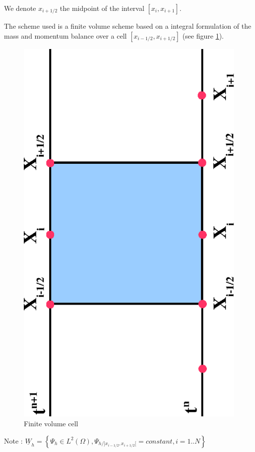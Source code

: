 \vspace{0.5cm}

We denote $x_{i+1/2}$ the midpoint of the interval $[x_i , x_{i+1}]$.

\vspace{0.5cm}

The scheme used is a finite volume scheme based on a integral formulation of the mass and momentum balance over a cell $[x_{i-1/2},x_{i+1/2}]$ (see figure \ref{Schm1}).

\begin{figure}
 \begin{center}
  \includegraphics[scale=0.5,angle=270]{Figures/Schema1.eps}
  \caption{Finite volume cell}
  \label{Schm1}
 \end{center}
\end{figure}
\vspace{0.5cm}
Note : $\underline{W}_h = \left \lbrace \Psi_h \in L^2 (\Omega), \Psi_{h/]x_{i-1/2},x_{i+1/2}[} = constant, i = 1..N \right \rbrace$

